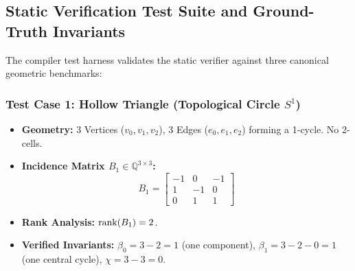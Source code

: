 \subsection{Static Verification Test Suite and Ground-Truth Invariants}
The compiler test harness validates the static verifier against three canonical geometric benchmarks:

\subsubsection{Test Case 1: Hollow Triangle (Topological Circle $S^1$)}
\begin{itemize}[leftmargin=1.5cm]
    \item \textbf{Geometry:} 3 Vertices ($v_0, v_1, v_2$), 3 Edges ($e_0, e_1, e_2$) forming a 1-cycle. No 2-cells.
    \item \textbf{Incidence Matrix $B_1 \in \mathbb{Q}^{3 \times 3}$:}
    \begin{equation}
        B_1 = \begin{bmatrix}
            -1 & 0 & -1 \\
            1 & -1 & 0 \\
            0 & 1 & 1
        \end{bmatrix}
    \end{equation}
    \item \textbf{Rank Analysis:} $\operatorname{rank}(B_1) = 2$.
    \item \textbf{Verified Invariants:} $\beta_0 = 3 - 2 = 1$ (one component), $\beta_1 = 3 - 2 - 0 = 1$ (one central cycle), $\chi = 3 - 3 = 0$.
\end{itemize}

